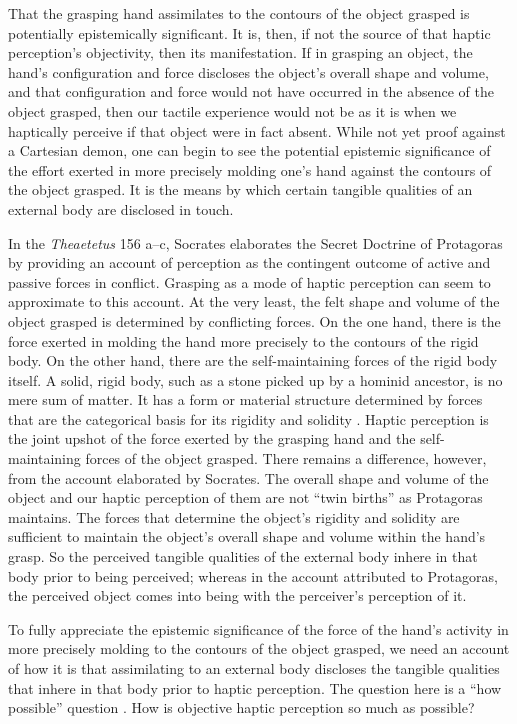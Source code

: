 \documentclass[12pt]{article}
\begin{document}
That the grasping hand assimilates to the contours of the object grasped is potentially epistemically significant. It is, then, if not the source of that haptic perception's objectivity, then its manifestation. If in grasping an object, the hand's configuration and force discloses the object's overall shape and volume, and that configuration and force would not have occurred in the absence of the object grasped, then our tactile experience would not be as it is when we haptically perceive if that object were in fact absent. While not yet proof against a Cartesian demon, one can begin to see the potential epistemic significance of the effort exerted in more precisely molding one's hand against the contours of the object grasped. It is the means by which certain tangible qualities of an external body are disclosed in touch. 

In the \emph{Theaetetus} 156 a--c, Socrates elaborates the Secret Doctrine of Protagoras by providing an account of perception as the contingent outcome of active and passive forces in conflict. Grasping as a mode of haptic perception can seem to approximate to this account. At the very least, the felt shape and volume of the object grasped is determined by conflicting forces. On the one hand, there is the force exerted in molding the hand more precisely to the contours of the rigid body. On the other hand, there are the self-maintaining forces of the rigid body itself. A solid, rigid body, such as a stone picked up by a hominid ancestor, is no mere sum of matter. It has a form or material structure determined by forces that are the categorical basis for its rigidity and solidity \citep{Johnston:2006js}. Haptic perception is the joint upshot of the force exerted by the grasping hand and the self-maintaining forces of the object grasped. There remains a difference, however, from the account elaborated by Socrates. The overall shape and volume of the object and our haptic perception of them are not ``twin births'' as Protagoras maintains. The forces that determine the object's rigidity and solidity are sufficient to maintain the object's overall shape and volume within the hand's grasp. So the perceived tangible qualities of the external body inhere in that body prior to being perceived; whereas in the account attributed to Protagoras, the perceived object comes into being with the perceiver's perception of it.

To fully appreciate the epistemic significance of the force of the hand's activity in more precisely molding to the contours of the object grasped, we need an account of how it is that assimilating to an external body discloses the tangible qualities that inhere in that body prior to haptic perception. The question here is a ``how possible'' question \citep{Cassam:2007lq}. How is objective haptic perception so much as possible?
\end{document}
